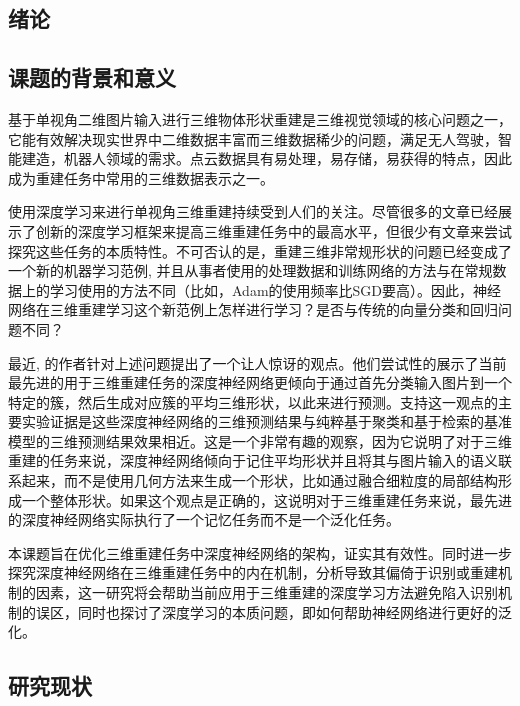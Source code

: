 \documentclass[bachelor, nocolorlinks, printoneside]{seuthesis} %
\begin{document}
\begin{Main} %

\chapter{绪论}

\section{课题的背景和意义}
基于单视角二维图片输入进行三维物体形状重建是三维视觉领域的核心问题之一，它能有效解决现实世界中二维数据丰富而三维数据稀少的问题，满足无人驾驶，智能建造，机器人领域的需求。点云数据具有易处理，易存储，易获得的特点，因此成为重建任务中常用的三维数据表示之一。

使用深度学习来进行单视角三维重建持续受到人们的关注。尽管很多的文章已经展示了创新的深度学习框架来提高三维重建任务中的最高水平\cite{li2018point,park2019deepsdf,fan2017point,tatarchenko2017octree,groueix2018papier,yang2018foldingnet,wang2018pixel2mesh,sun2018pix3d,tulsiani2017multi,wu2017marrnet,yan2016perspective}，但很少有文章来尝试探究这些任务的本质特性。不可否认的是，重建三维非常规形状的问题已经变成了一个新的机器学习范例, 并且从事者使用的处理数据和训练网络的方法与在常规数据上的学习使用的方法不同（比如，Adam\cite{kingma2014adam}的使用频率比SGD要高）。因此，神经网络在三维重建学习这个新范例上怎样进行学习？是否与传统的向量分类和回归问题不同？

最近, \cite{tatarchenko2019single}的作者针对上述问题提出了一个让人惊讶的观点。他们尝试性的展示了当前最先进的用于三维重建任务的深度神经网络更倾向于通过首先分类输入图片到一个特定的簇，然后生成对应簇的平均三维形状，以此来进行预测。支持这一观点的主要实验证据是这些深度神经网络的三维预测结果与纯粹基于聚类和基于检索的基准模型的三维预测结果效果相近。这是一个非常有趣的观察，因为它说明了对于三维重建的任务来说，深度神经网络倾向于记住平均形状并且将其与图片输入的语义联系起来，而不是使用几何方法来生成一个形状，比如通过融合细粒度的局部结构形成一个整体形状。如果这个观点是正确的，这说明对于三维重建任务来说，最先进的深度神经网络实际执行了一个记忆任务而不是一个泛化任务\cite{arpit2017closer}。

本课题旨在优化三维重建任务中深度神经网络的架构，证实其有效性。同时进一步探究深度神经网络在三维重建任务中的内在机制，分析导致其偏倚于识别或重建机制的因素，这一研究将会帮助当前应用于三维重建的深度学习方法避免陷入识别机制的误区，同时也探讨了深度学习的本质问题，即如何帮助神经网络进行更好的泛化。

\section{研究现状}

\end{Main}
\end{document}
